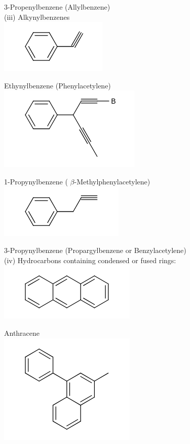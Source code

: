 \documentclass[10pt]{article}
\begin{document}
3-Propenylbenzene (Allylbenzene)\\
(iii) Alkynylbenzenes\\
\includegraphics{smile-da00d0db95b79fea860a69e65dbbd2b7bd29e31e}

Ethynylbenzene (Phenylacetylene)\\
\includegraphics{smile-43abc6bab960e66e586dbfc06098e398c7f68c83}

1-Propynylbenzene ( $\beta$-Methylphenylacetylene)\\
\includegraphics{smile-86fc1eeacbba916d7e298223359fc7646698b1c2}

3-Propynylbenzene (Propargylbenzene or Benzylacetylene)\\
(iv) Hydrocarbons containing condensed or fused rings:\\
\includegraphics{smile-acdd157e4fc42daa5c31508ac20394f960d051fc}

Anthracene\\
\includegraphics{smile-3e35d422dc8d0f87d4edc515c00fd8c5882ff261}
\end{document}
